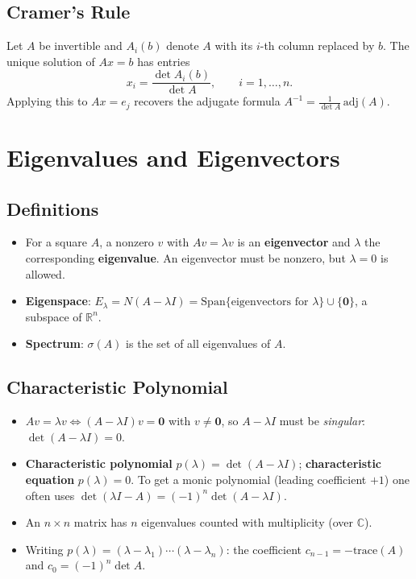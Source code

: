\documentclass[hidelinks]{article}
\begin{document}
\subsection{Cramer's Rule}
Let $A$ be invertible and $A_i(b)$ denote $A$ with its $i$-th column replaced by $b$. The unique solution of $Ax=b$ has entries
\[
    x_i = \frac{\det A_i(b)}{\det A},\qquad i = 1,\ldots,n.
\]
Applying this to $Ax = e_j$ recovers the adjugate formula $A^{-1} = \frac{1}{\det A}\,\mathrm{adj}(A)$.

\section{Eigenvalues and Eigenvectors}

\subsection{Definitions}
\begin{itemize}
    \item For a square $A$, a nonzero $v$ with $Av = \lambda v$ is an \textbf{eigenvector} and $\lambda$ the corresponding \textbf{eigenvalue}. An eigenvector must be nonzero, but $\lambda = 0$ is allowed.
    \item \textbf{Eigenspace}: $E_\lambda = N(A-\lambda I) = \mathrm{Span}\{\text{eigenvectors for }\lambda\}\cup\{\mathbf 0\}$, a subspace of $\mathbb{R}^n$.
    \item \textbf{Spectrum}: $\sigma(A)$ is the set of all eigenvalues of $A$.
\end{itemize}

\subsection{Characteristic Polynomial}
\begin{itemize}
    \item $Av=\lambda v \iff (A-\lambda I)v = \mathbf 0$ with $v\neq\mathbf 0$, so $A-\lambda I$ must be \emph{singular}: $\det(A-\lambda I)=0$.
    \item \textbf{Characteristic polynomial} $p(\lambda) = \det(A - \lambda I)$; \textbf{characteristic equation} $p(\lambda)=0$. To get a monic polynomial (leading coefficient $+1$) one often uses $\det(\lambda I - A) = (-1)^n\det(A-\lambda I)$.
    \item An $n\times n$ matrix has $n$ eigenvalues counted with multiplicity (over $\mathbb{C}$).
    \item Writing $p(\lambda) = (\lambda-\lambda_1)\cdots(\lambda-\lambda_n)$: the coefficient $c_{n-1} = -\mathrm{trace}(A)$ and $c_0 = (-1)^n\det A$.
\end{itemize}
\end{document}
